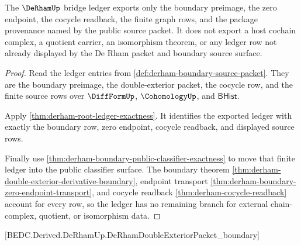 \begin{theorem}
\label{thm:derham-bridge-ledger-source-scope}
The $\DeRhamUp$ bridge ledger exports only the boundary preimage, the zero
endpoint, the cocycle readback, the finite graph rows, and the package
provenance named by the public source packet. It does not export a host
cochain complex, a quotient carrier, an isomorphism theorem, or any ledger row
not already displayed by the De Rham packet and boundary source surface.
\end{theorem}
\begin{proof}
Read the ledger entries from
\autoref{def:derham-boundary-source-packet}. They are the boundary preimage,
the double-exterior packet, the cocycle row, and the finite source rows over
$\DiffFormUp$, $\CohomologyUp$, and $\mathsf{BHist}$.

Apply \autoref{thm:derham-root-ledger-exactness}. It identifies the exported
ledger with exactly the boundary row, zero endpoint, cocycle readback, and
displayed source rows.

Finally use
\autoref{thm:derham-boundary-public-classifier-exactness} to move that finite
ledger into the public classifier surface. The boundary theorem
\autoref{thm:derham-double-exterior-derivative-boundary}, endpoint transport
\autoref{thm:derham-boundary-zero-endpoint-transport}, and cocycle readback
\autoref{thm:derham-cocycle-readback} account for every row, so the ledger has
no remaining branch for external chain-complex, quotient, or isomorphism data.
\end{proof}





[BEDC.Derived.DeRhamUp.DeRhamDoubleExteriorPacket\_boundary]

